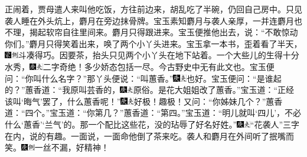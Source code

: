 正闹着，贾母遣人来叫他吃饭，方往前边来，胡乱吃了半碗，仍回自己房中。只见袭人睡在外头炕上，麝月在旁边抹骨牌。宝玉素知麝月与袭人亲厚，一并连麝月也不理，揭起软帘自往里间来。麝月只得跟进来。宝玉便推他出去，说：“不敢惊动你们。”麝月只得笑着出来，唤了两个小丫头进来。宝玉拿一本书，歪着看了半天，{\includegraphics[width=3mm]{../Images/00006}\includegraphics[width=3mm]{../Images/00011}\footnotesize \kaishu 斗凑得巧。}因要茶，抬头只见两个小丫头在地下站着。一个大些儿的生得十分水秀，{\includegraphics[width=3mm]{../Images/00004}\includegraphics[width=3mm]{../Images/00012}\footnotesize \kaishu 二字奇绝！多少娇态包括一尽。今古野史中无有此文也。}宝玉便问：“你叫什么名字？”那丫头便说：“叫蕙香。”{\includegraphics[width=3mm]{../Images/00004}\includegraphics[width=3mm]{../Images/00012}\footnotesize \kaishu 也好。}宝玉便问：“是谁起的？”蕙香道：“我原叫芸香的，{\includegraphics[width=3mm]{../Images/00004}\includegraphics[width=3mm]{../Images/00012}\footnotesize \kaishu 原俗。}是花大姐姐改了蕙香。”宝玉道：“正经该叫‘晦气’罢了，什么蕙香呢！”{\includegraphics[width=3mm]{../Images/00004}\includegraphics[width=3mm]{../Images/00012}\footnotesize \kaishu 好极！趣极！}又问：“你姊妹几个？”蕙香道：“四个。”宝玉道：“你第几？”蕙香道：“第四。”宝玉道：“明儿就叫‘四儿’，不必什么‘蕙香’‘兰气’的。那一个配比这些花，没的玷辱了好名好姓。”{\includegraphics[width=3mm]{../Images/00004}\includegraphics[width=3mm]{../Images/00012}\footnotesize \kaishu “花袭人”三字在内，说的有趣。}一面说，一面命他倒了茶来吃。袭人和麝月在外间听了抿嘴而笑。{\includegraphics[width=3mm]{../Images/00004}\includegraphics[width=3mm]{../Images/00011}\footnotesize \kaishu 一丝不漏，好精神！}

